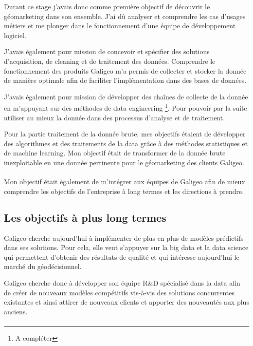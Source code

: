 Durant ce stage j’avais donc comme première objectif de découvrir le géomarketing dans son ensemble. J’ai dû analyser et comprendre les cas d’usages métiers et me plonger dans le fonctionnement d’une équipe de développement logiciel.

J’avais également pour mission de concevoir et spécifier des solutions d’acquisition, de cleaning et de traitement des données. Comprendre le fonctionnement des produits Galigeo m’a permis de collecter et stocker la donnée de manière optimale afin de faciliter l’implémentation dans des bases de données.

J’avais également pour mission de développer des chaînes de collecte de la donnée en m’appuyant sur des méthodes de data engineering \footnote{A compléter}. Pour pouvoir par la suite utiliser au mieux la donnée dans des processus d’analyse et de traitement.

Pour la partie traitement de la donnée brute, mes objectifs étaient de développer des algorithmes et des traitements de la data grâce à des méthodes statistiques et de machine learning. Mon objectif était de transformer de la donnée brute inexploitable en une donnée pertinente pour le géomarketing des clients Galigeo.

\paragraph*{}

Mon objectif était également de m’intégrer aux équipes de Galigeo afin de mieux comprendre les objectifs de l’entreprise à long termes et les directions à prendre.


\subsection{Les objectifs à plus long termes}

Galigeo cherche aujourd’hui à implémenter de plus en plus de modèles prédictifs dans ses solutions. Pour cela, elle veut s’appuyer sur la big data et la data science qui permettent d’obtenir des résultats de qualité et qui intéresse aujourd’hui le marché du géodécisionnel.

Galigeo cherche donc à développer son équipe R\&D spécialisé dans la data afin de créer de nouveaux modèles compétitifs vis-à-vis des solutions concurrentes existantes et ainsi attirer de nouveaux clients et apporter des nouveautés aux plus anciens.

\paragraph*{}

